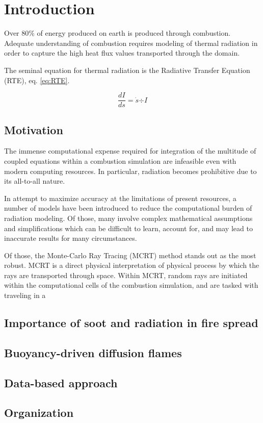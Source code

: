 \addchapheadtotoc

\chapter{Introduction}
Over 80\% of energy produced on earth is produced through combustion. Adequate understanding of combustion requires modeling of thermal radiation in order to capture the high heat flux values transported through the domain.

The seminal equation for thermal radiation is the Radiative Transfer Equation (RTE), eq. \ref{eq:RTE}.

\begin{equation}
    \frac{dI}{ds} = \dot{s}{\div{I}}
\end{equation}


\section{Motivation}
The immense computational expense required for integration of the multitude of coupled equations within a combustion simulation are infeasible even with modern computing resources. In particular, radiation becomes prohibitive due to its all-to-all nature. 

In attempt to maximize accuracy at the limitations of present resources, a number of models have been introduced to reduce the computational burden of radiation modeling. 
Of those, many involve complex mathematical assumptions and simplifications which can be difficult to learn, account for, and may lead to inaccurate results for many circumstances. 


Of those, the Monte-Carlo Ray Tracing (MCRT) method stands out as the most robust. 
MCRT is a direct physical interpretation of physical process by which the rays are transported through space.
Within MCRT, random rays are initiated within the computational cells of the combustion simulation, and are tasked with traveling in a 

\section{Importance of soot and radiation in fire spread}
 

\section{Buoyancy-driven diffusion flames}
\section{Data-based approach}

\section{Organization}
